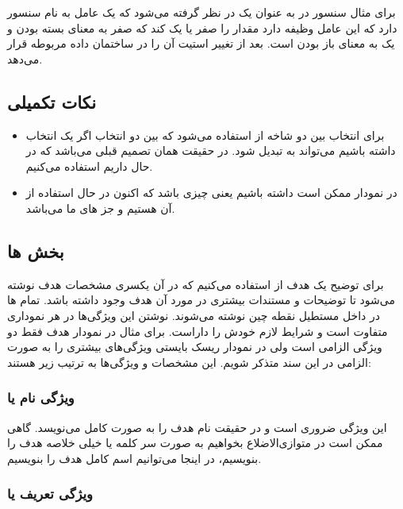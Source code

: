 برای مثال سنسور در به عنوان یک  در نظر گرفته می‌شود که یک عامل به
نام سنسور دارد که این عامل وظیفه دارد مقدار  را صفر یا یک کند که
صفر به معنای بسته بودن و یک به معنای باز بودن است. بعد از تغییر استیت آن را در
ساختمان داده مربوطه قرار می‌دهد.

\subsection{نکات تکمیلی}

\begin{itemize}
    \item برای انتخاب بین دو شاخه از  استفاده می‌شود که بین دو انتخاب
    اگر یک انتخاب داشته باشیم می‌تواند به  تبدیل شود. در حقیقت
    همان تصمیم قبلی می‌باشد که در حال داریم استفاده می‌کنیم.
    \item در نمودار ممکن است  داشته باشیم یعنی چیزی باشد که
    اکنون در حال استفاده از آن هستیم و جز های ما می‌باشد.
\end{itemize}

\subsection{بخش ها}

برای توضیح یک هدف از  استفاده می‌کنیم که در آن یکسری مشخصات هدف
نوشته می‌شود تا توضیحات و مستندات بیشتری در مورد آن هدف وجود داشته باشد. تمام
ها در داخل مستطیل نقطه چین نوشته می‌شوند. نوشتن این ویژگی‌ها در
هر نموداری متفاوت است و شرایط لازم خودش را داراست. برای مثال در نمودار هدف فقط
دو ویژگی الزامی است ولی در نمودار ریسک بایستی ویژگی‌های بیشتری را به صورت الزامی
در این سند متذکر شویم. این مشخصات و ویژگی‌ها به ترتیب زیر هستند:

\subsubsection{ویژگی نام یا }

این ویژگی ضروری است و در حقیقت نام هدف را به صورت کامل می‌نویسد. گاهی ممکن است
در متوازی‌الاضلاع بخواهیم به صورت سر کلمه یا خیلی خلاصه هدف را بنویسیم، در اینجا
می‌توانیم اسم کامل هدف را بنویسیم.

\subsubsection{ویژگی تعریف یا }

